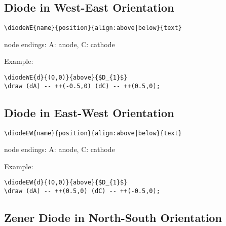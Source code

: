 \documentclass[parskip=full]{scrartcl}
\begin{document}
\subsection{Diode in West-East Orientation}

\begin{verbatim}
\diodeWE{name}{position}{align:above|below}{text}
\end{verbatim}
node endings: A: anode, C: cathode

Example:\\
\begin{minipage}{0.8\textwidth}
\begin{verbatim}
\diodeWE{d}{(0,0)}{above}{$D_{1}$}
\draw (dA) -- ++(-0.5,0) (dC) -- ++(0.5,0);
\end{verbatim}
\end{minipage}
\begin{minipage}{0.19\textwidth}
\end{minipage}

\subsection{Diode in East-West Orientation}

\begin{verbatim}
\diodeEW{name}{position}{align:above|below}{text}
\end{verbatim}
node endings: A: anode, C: cathode

Example:\\
\begin{minipage}{0.8\textwidth}
\begin{verbatim}
\diodeEW{d}{(0,0)}{above}{$D_{1}$}
\draw (dA) -- ++(0.5,0) (dC) -- ++(-0.5,0);
\end{verbatim}
\end{minipage}
\begin{minipage}{0.19\textwidth}
\end{minipage}

\subsection{Zener Diode in North-South Orientation}
\end{document}
